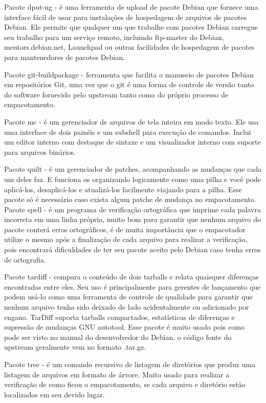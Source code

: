 Pacote dput-ng - é uma ferramenta de upload de pacote Debian que fornece uma interface fácil de usar para instalações de hospedagem de arquivos de pacotes Debian. Ele permite que qualquer um que trabalhe com pacotes Debian carregue seu trabalho para um serviço remoto, incluindo ftp-master do Debian, mentors.debian.net, Launchpad ou outras facilidades de hospedagem de pacotes para mantenedores de pacotes Debian.

Pacote git-buildpackage - ferramenta que facilita o manuseio de pacotes Debian em repositórios Git, uma vez que o git é uma forma de controle de versão tanto do software fornecido pelo upstream tanto como do próprio processo de empacotamento.

Pacote mc - é um gerenciador de arquivos de tela inteira em modo texto. Ele usa uma interface de dois painéis e um subshell para execução de comandos. Inclui um editor interno com destaque de sintaxe e um visualizador interno com suporte para arquivos binários.

Pacote quilt - é um gerenciador de patches, acompanhando as mudanças que cada um deles faz. E funciona os organizando logicamente como uma pilha e você pode aplicá-los, desaplicá-los e atualizá-los facilmente viajando para a pilha. Esse pacote só é necessário caso exista algum patche de mudança no empacotamento. 
Pacote spell - é um programa de verificação ortográfica que imprime cada palavra incorreta em uma linha própria, muito bom para garantir que nenhum arquivo do pacote conterá erros ortográficos, é de muita importância que o empacotador utilize o mesmo após a finalização de cada arquivo para realizar a verificação, pois encontrará dificuldades de ter seu pacote aceito pelo Debian caso tenha erros de ortografia.

Pacote tardiff - compara o conteúdo de dois tarballs e relata quaisquer diferenças encontradas entre eles. Seu uso é principalmente para gerentes de lançamento que podem usá-lo como uma ferramenta de controle de qualidade para garantir que nenhum arquivo tenha sido deixado de lado acidentalmente ou adicionado por engano. TarDiff suporta tarballs compactados, estatísticas de diferenças e supressão de mudanças GNU autotool. Esse pacote é muito usado pois como pode ser visto no manual do desenvolvedor do Debian, o código fonte do upstream geralmente vem no formato .tar.gz.

Pacote tree - é um comando recursivo de listagem de diretórios que produz uma listagem de arquivos em formato de árvore. Muito usado para realizar a verificação de como ficou o empacotamento, se cada arquivo e diretório estão localizados em seu devido lugar. 

